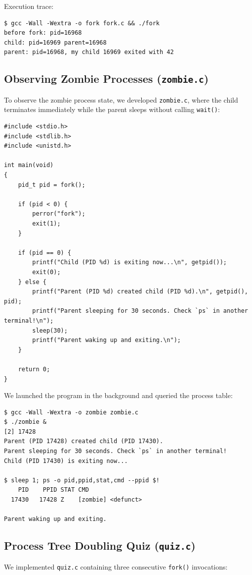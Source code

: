 \documentclass[12pt,a4paper]{article}
\begin{document}
Execution trace:
\begin{lstlisting}[style=consolestyle]
$ gcc -Wall -Wextra -o fork fork.c && ./fork
before fork: pid=16968
child: pid=16969 parent=16968
parent: pid=16968, my child 16969 exited with 42
\end{lstlisting}

\subsection{Observing Zombie Processes (\texttt{zombie.c})}
To observe the zombie process state, we developed \texttt{zombie.c}, where the child terminates immediately while the parent sleeps without calling \texttt{wait()}:

\begin{lstlisting}[style=cstyle]
#include <stdio.h>
#include <stdlib.h>
#include <unistd.h>

int main(void)
{
    pid_t pid = fork();

    if (pid < 0) {
        perror("fork");
        exit(1);
    }

    if (pid == 0) {
        printf("Child (PID %d) is exiting now...\n", getpid());
        exit(0);
    } else {
        printf("Parent (PID %d) created child (PID %d).\n", getpid(), pid);
        printf("Parent sleeping for 30 seconds. Check `ps` in another terminal!\n");
        sleep(30);
        printf("Parent waking up and exiting.\n");
    }

    return 0;
}
\end{lstlisting}

We launched the program in the background and queried the process table:
\begin{lstlisting}[style=consolestyle]
$ gcc -Wall -Wextra -o zombie zombie.c
$ ./zombie &
[2] 17428
Parent (PID 17428) created child (PID 17430).
Parent sleeping for 30 seconds. Check `ps` in another terminal!
Child (PID 17430) is exiting now...

$ sleep 1; ps -o pid,ppid,stat,cmd --ppid $!
    PID    PPID STAT CMD
  17430   17428 Z    [zombie] <defunct>

Parent waking up and exiting.
\end{lstlisting}

\subsection{Process Tree Doubling Quiz (\texttt{quiz.c})}
We implemented \texttt{quiz.c} containing three consecutive \texttt{fork()} invocations:
\end{document}
